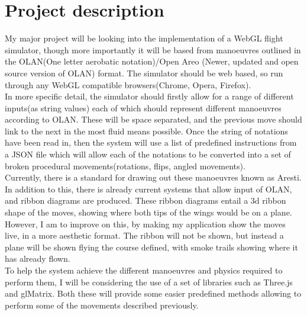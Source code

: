 \documentclass[11pt,fleqn,twoside]{article}
\begin{document}
\wordcount{}
\mmp

\setcounter{tocdepth}{3}


\section{Project description}
My major project will be looking into the implementation of a WebGL flight simulator, though more importantly it will be based from manoeuvres outlined in the OLAN(One letter aerobatic notation)/Open Areo (Newer, updated and open source version of OLAN) format. The simulator should be web based, so run through any WebGL compatible browsers(Chrome, Opera, Firefox).\\
In more specific detail, the simulator should firstly allow for a range of different inputs(as string values) each of which should represent different manoeuvres according to OLAN. These will be space separated, and the previous move should link to the next in the most fluid means possible. Once the string of notations have been read in, then the system will use a list of predefined instructions from a JSON file which will allow each of the notations to be converted into a set of broken procedural movements(rotations, flips, angled movements).\\
Currently, there is a standard for drawing out these manoeuvres known as Aresti. In addition to this, there is already current systems that allow input of OLAN, and ribbon diagrams are produced. These ribbon diagrams entail a 3d ribbon shape of the moves, showing where both tips of the wings would be on a plane. However, I am to improve on this, by making my application show the moves live, in a more aesthetic format. The ribbon will not be shown, but instead a plane will be shown flying the course defined, with smoke trails showing where it has already flown.  \\
To help the system achieve the different manoeuvres and physics required to perform them, I will be considering the use of a set of libraries such as Three.js and glMatrix. Both these will provide some easier predefined methods allowing to perform some of the movements described previously. \\
\end{document}
